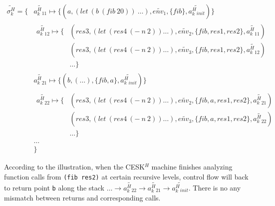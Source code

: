 \documentclass{article}
\begin{document}
\[
\begin{aligned}
\widetilde{\sigma_k^H} = \{ {}& \widetilde{a^H_k{}_{11}} \mapsto \{(a, (let\ (b\ (fib\ 20))\ \dots), \widetilde{env_1}, \{fib\}, \widetilde{a^H_k{}_{init}})\}  {} \\
                            &
                            \begin{aligned}
                              \widetilde{a^H_k{}_{12}} \mapsto
                              \{{}& (res3, (let\ (res4\ (-\ n\ 2)) \dots), \widetilde{env_2}, \{fib, res1, res2\}, \widetilde{a^H_k{}_{11}}) {}\\
                              & (res3, (let\ (res4\ (-\ n\ 2)) \dots), \widetilde{env_3}, \{fib, res1, res2\}, \widetilde{a^H_k{}_{12}}) {} \\
                              & \dots
                              \}
                            \end{aligned} {} \\
                            & \widetilde{a^H_k{}_{21}} \mapsto \{(b, (\dots), \{fib, a\}, \widetilde{a^H_k{}_{init}}) \} {}\\
                            &
                            \begin{aligned}
                              \widetilde{a^H_k{}_{22}} \mapsto
                              \{{}& (res3, (let\ (res4\ (-\ n\ 2)) \dots), \widetilde{env_2}, \{fib, a, res1, res2\}, \widetilde{a^H_k{}_{21}}) {}\\
                              & (res3, (let\ (res4\ (-\ n\ 2)) \dots), \widetilde{env_3}, \{fib, a, res1, res2\}, \widetilde{a^H_k{}_{22}}) {} \\
                              & \dots
                              \}
                            \end{aligned} {}\\
                            & \dots {}\\
                            & \}
\end{aligned}
\]

According to the illustration, when the CESK$^H$ machine finishes analyzing function calls from \verb|(fib res2)| at certain recursive levels, control flow will back to return point \verb|b| along the stack $\dots \to \widetilde{a^H_k{}_{22}} \to \widetilde{a^H_k{}_{21}} \to \widetilde{a^H_k{}_{init}}$. There is no any mismatch between returns and corresponding calls.
\end{document}
